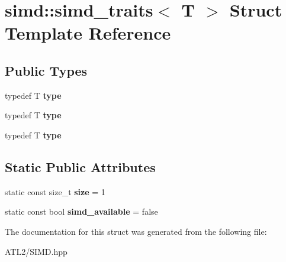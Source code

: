 \hypertarget{structsimd_1_1simd__traits}{\section{simd\+:\+:simd\+\_\+traits$<$ T $>$ Struct Template Reference}
\label{structsimd_1_1simd__traits}
}
\subsection*{Public Types}
\begin{DoxyCompactItemize}
\item 
\hypertarget{structsimd_1_1simd__traits_a5f408598bf34103ed9204f1522d425fe}{typedef T {\bfseries type}}\label{structsimd_1_1simd__traits_a5f408598bf34103ed9204f1522d425fe}

\item 
\hypertarget{structsimd_1_1simd__traits_a5f408598bf34103ed9204f1522d425fe}{typedef T {\bfseries type}}\label{structsimd_1_1simd__traits_a5f408598bf34103ed9204f1522d425fe}

\item 
\hypertarget{structsimd_1_1simd__traits_a5f408598bf34103ed9204f1522d425fe}{typedef T {\bfseries type}}\label{structsimd_1_1simd__traits_a5f408598bf34103ed9204f1522d425fe}

\end{DoxyCompactItemize}
\subsection*{Static Public Attributes}
\begin{DoxyCompactItemize}
\item 
\hypertarget{structsimd_1_1simd__traits_a8018991b9625b9f94b69d86a7a28605e}{static const size\+\_\+t {\bfseries size} = 1}\label{structsimd_1_1simd__traits_a8018991b9625b9f94b69d86a7a28605e}

\item 
\hypertarget{structsimd_1_1simd__traits_af3184e22ede01ff34dac986fa7bf02db}{static const bool {\bfseries simd\+\_\+available} = false}\label{structsimd_1_1simd__traits_af3184e22ede01ff34dac986fa7bf02db}

\end{DoxyCompactItemize}


The documentation for this struct was generated from the following file\+:\begin{DoxyCompactItemize}
\item 
A\+T\+L2/S\+I\+M\+D.\+hpp\end{DoxyCompactItemize}
